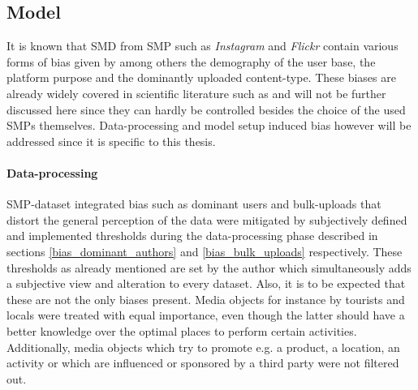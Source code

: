 \subsection*{Model}
It is known that SMD from SMP such as \textit{Instagram} and \textit{Flickr} contain various forms of bias given by among others the demography of the user base, the platform purpose and the dominantly uploaded content-type. These biases are already widely covered in scientific literature such as \parencite{} and will not be further discussed here since they can hardly be controlled besides the choice of the used SMPs themselves. Data-processing and model setup induced bias however will be addressed since it is specific to this thesis. \\

\paragraph*{Data-processing} SMP-dataset integrated bias such as dominant users and bulk-uploads that distort the general perception of the data were mitigated by subjectively defined and implemented thresholds during the data-processing phase described in sections \ref{bias_dominant_authors} and \ref{bias_bulk_uploads} respectively. These thresholds as already mentioned are set by the author which simultaneously adds a subjective view and alteration to every dataset. Also, it is to be expected that these are not the only biases present. Media objects for instance by tourists and locals were treated with equal importance, even though the latter should have a better knowledge over the optimal places to perform certain activities. Additionally, media objects which try to promote e.g. a product, a location, an activity or which are influenced or sponsored by a third party were not filtered out.\\
